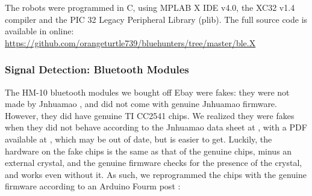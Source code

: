 \documentclass[]{article}
\begin{document}
The robots were programmed in C, using MPLAB X IDE v4.0, the XC32 v1.4
compiler and the PIC 32 Legacy Peripheral Library (plib).
The full source code is available in online: \url{https://github.com/orangeturtle739/bluehunters/tree/master/ble.X}

\subsubsection{Signal Detection: Bluetooth Modules}


The HM-10 bluetooth modules we bought off Ebay were fakes: they were not made by Jnhuamao , and did not come with genuine Jnhuamao firmware.
However, they did have genuine TI CC2541 chips.
We realized they were fakes when they did not behave according to
the Jnhuamao data sheet at \cite{jnhuamaodatasheet},
with a PDF available at \cite{jnhuamaomit}, which may be out of date, but is easier to get.
Luckily, the hardware on the fake chips is the same as that of the genuine chips, minus an external crystal, and the genuine firmware checks for the presence of the crystal, and works even without
it. \cite{crystal}
As such, we reprogrammed the chips with the genuine firmware according
to an Arduino Fourm post \cite{crystal}:
\end{document}
